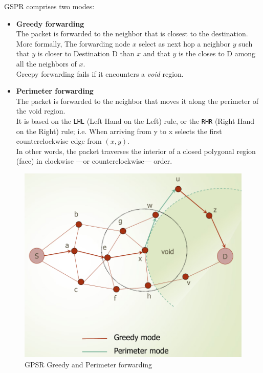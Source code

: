\begin{paracol}{2}
   
   GSPR comprises two modes:
   \begin{itemize}
      \item \textbf{Greedy forwarding}\\
      The packet is forwarded to the neighbor that is closest to the destination.\\
      More formally,
      The forwarding node $x$ select as next hop a neighbor $y$ such that $y$ is closer to Destination D than $x$ and that $y$ is the closes to D among all the neighbors of $x$.\\
      Greepy forwarding fails if it encounters a \textit{void} region.
      \item \textbf{Perimeter forwarding}\\
      The packet is forwarded to the neighbor that moves it along the perimeter of the void region.\\
      It is based on the \texttt{LHL} (Left Hand on the Left) rule, or the \texttt{RHR} (Right Hand on the Right) rule; i.e. When arriving from y to x selects the first
      counterclockwise edge from $(x,y)$.\\
      In other words, the packet traverses the interior of a closed polygonal region (face) in clockwise ---or counterclockwise--- order.
   \end{itemize}
   \switchcolumn
   
   \colfill
   \begin{figure}[htbp]
      \centering
      \includegraphics{images/GPSR_modes.png}
      \caption{GPSR Greedy and Perimeter forwarding}
      \label{fig:GPSR_modes}
   \end{figure}
   \colfill

\end{paracol}

